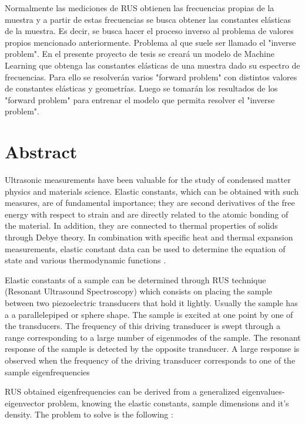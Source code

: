\documentclass[12pt]{article}
\begin{document}
Normalmente las mediciones de RUS obtienen las frecuencias propias de la muestra y a partir de estas frecuencias se busca obtener las constantes elásticas de la muestra. Es decir, se busca hacer el proceso inverso al problema de valores propios mencionado anteriormente. Problema al que suele ser llamado el "inverse problem". En el presente proyecto de tesis se creará un modelo de Machine Learning que obtenga las constantes elásticas de una muestra dado su espectro de frecuencias. Para ello se resolverán varios "forward problem" con distintos valores de constantes elásticas y geometrías. Luego se tomarán los resultados de los "forward problem" para entrenar el modelo que permita resolver el "inverse problem".

\section{Abstract}
Ultrasonic measurements have been valuable for the study of condensed matter physics and materials science. Elastic constants, which can be obtained with such measures, are of fundamental importance; they are second derivatives of the free energy with respect to strain and are directly related to the atomic bonding of the material. In addition, they are connected to thermal properties of solids through Debye theory. In combination with specific heat and thermal expansion measurements, elastic constant data can be used to determine the equation of state and various thermodynamic functions \cite{Leisure_1997}.

Elastic constants of a sample can be determined through RUS technique (Resonant Ultrasound Spectroscopy) which consists on placing the sample between two piezoelectric transducers that hold it lightly. Usually the sample has a a parallelepiped or sphere shape. The sample is excited at one point by one of the transducers. The frequency of this driving transducer is swept through a range corresponding to a large number of eigenmodes of the sample. The resonant response of the sample is detected by the opposite transducer. A large response is observed when the frequency of the driving transducer corresponds to one of the sample eigenfrequencies \cite{Leisure_1997}

RUS obtained eigenfrequencies can be derived from a generalized eigenvalues-eigenvector problem, knowing the elastic constants, sample dimensions and it's density. The problem to solve is the following \cite{Leisure_1997}:
\end{document}
